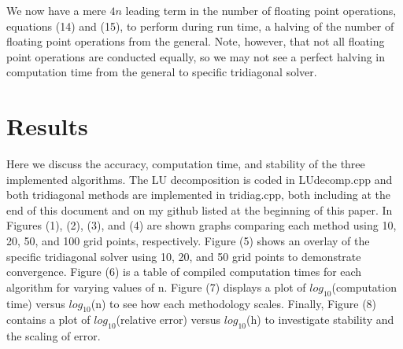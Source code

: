 \documentclass[11pt,a4paper]{article}
\begin{document}
We now have a mere $4n$ leading term in the number of floating point operations, equations (14) and (15), to perform during run time, a halving of the number of floating point operations from the general. Note, however, that not all floating point operations are conducted equally, so we may not see a perfect halving in computation time from the general to specific tridiagonal solver.

\section{Results}

Here we discuss the accuracy, computation time, and stability of the three implemented algorithms. The LU decomposition is coded in LUdecomp.cpp and both tridiagonal methods are implemented in tridiag.cpp, both including at the end of this document and on my github listed at the beginning of this paper. In Figures (1), (2), (3), and (4) are shown graphs comparing each method using 10, 20, 50, and 100 grid points, respectively. Figure (5) shows an overlay of the specific tridiagonal solver using 10, 20, and 50 grid points to demonstrate convergence. Figure (6) is a table of compiled computation times for each algorithm for varying values of n. Figure (7) displays a plot of $log_{10}$(computation time) versus $log_{10}$(n) to see how each methodology scales. Finally, Figure (8) contains a plot of $log_{10}$(relative error) versus $log_{10}$(h) to investigate stability and the scaling of error.
\end{document}
